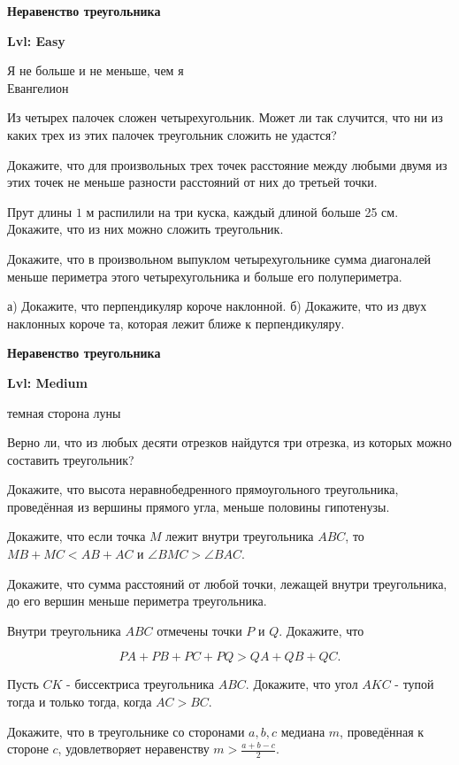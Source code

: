 \centerline{\bf \Huge Неравенство треугольника}
\centerline{\bf \Huge Lvl: Easy}

\begin{flushright}
        \scriptsize{Я не больше и не меньше, чем я\\ Евангелион}
\end{flushright}

Из четырех палочек сложен четырехугольник. Может ли так случится, что ни из каких трех из этих палочек треугольник сложить не удастся?

Докажите, что для произвольных трех точек расстояние между любыми двумя из этих точек не меньше разности расстояний от них до третьей точки.

Прут длины $1$ м распилили на три куска, каждый длиной больше 25 см. Докажите, что из них можно сложить треугольник.

Докажите, что в произвольном выпуклом четырехугольнике сумма диагоналей меньше периметра этого четырехугольника и больше его полупериметра.

а) Докажите, что перпендикуляр короче наклонной. б) Докажите, что из двух наклонных короче та, которая лежит ближе к перпендикуляру.

\newpage

\hspace{3mm}

\centerline{\bf \Huge Неравенство треугольника}
\centerline{\bf \Huge Lvl: Medium}

\begin{flushright}
        \scriptsize{темная сторона луны}
\end{flushright}


Верно ли, что из любых десяти отрезков найдутся три отрезка, из которых можно составить треугольник?

Докажите, что высота неравнобедренного прямоугольного треугольника, проведённая из вершины прямого угла, меньше половины гипотенузы.

Докажите, что если точка $M$ лежит внутри треугольника $A B C$, то $M B+M C< A B+A C$ и $\angle B M C>\angle B A C$.

Докажите, что сумма расстояний от любой точки, лежащей внутри треугольника, до его вершин меньше периметра треугольника.

Внутри треугольника $A B C$ отмечены точки $P$ и $Q$. Докажите, что

$$
P A+P B+P C+P Q>Q A+Q B+Q C .
$$


Пусть $C K$ - биссектриса треугольника $A B C$. Докажите, что угол $A K C$ - тупой тогда и только тогда, когда $A C>B C$.

Докажите, что в треугольнике со сторонами $a, b, c$ медиана $m$, проведённая к стороне $c$, удовлетворяет неравенству $m>\frac{a+b-c}{2}$.
